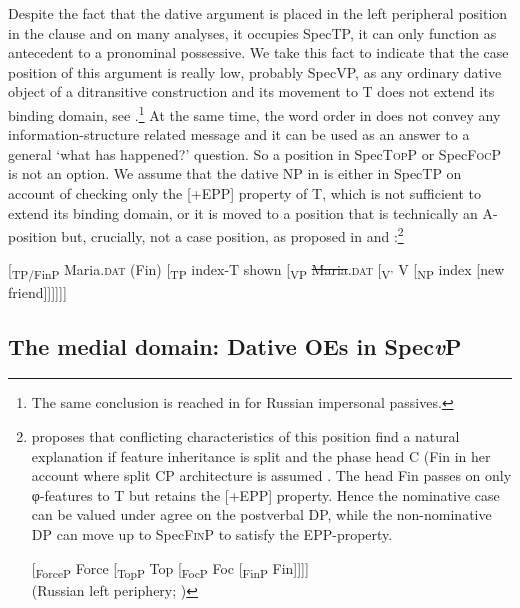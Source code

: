 \documentclass[output=paper,modfonts,nonflat
]{langsci/langscibook}
\begin{document}
\noindent Despite the fact that the dative argument is placed in the left peripheral position in the clause and on many analyses, it occupies SpecTP, it can only function as antecedent to a pronominal possessive. We take this fact to indicate that the case position of this argument is really low, probably SpecVP, as any ordinary dative object of a ditransitive construction and its movement to T does not extend its binding domain, see .\footnote{\label{fn21}The same conclusion is reached in \cite{mooreperlmutter2000} for Russian impersonal passives.} At the same time, the word order in  does not convey any information-structure related message and it can be used as an answer to a general ‘what has happened?’ question. So a position in Spec\textsc{Top}P or Spec\textsc{Foc}P is not an option. We assume that the dative NP in  is either in SpecTP on account of checking only the [+EPP] property of T, which is not sufficient to extend its binding domain, or it is moved to a position that is technically an A-position but, crucially, not a case position, as proposed in \cite{germain2015} and \cite{citkoetal2018}:\footnote{\label{fn22}\cite{germain2015} proposes that conflicting characteristics of this position find a natural explanation if feature inheritance is split and the phase head C (Fin in her account where  split CP architecture is assumed . The head Fin passes on only φ-features to T but retains the [+EPP] property. Hence the nominative case can be valued under agree on the postverbal DP, while the non-nominative DP can move up to Spec\textsc{Fin}P to satisfy the EPP-property.

\ea\label{split_cp_rus}
{[\textsubscript{ForceP} Force [\textsubscript{TopP} Top [\textsubscript{FocP} Foc [\textsubscript{FinP} Fin]]]]}\\
\xspace\hfill (Russian left periphery; \citealt[428]{germain2015})
\z
}

\ea \label{ex:witkos:33}
{[\textsubscript{TP/FinP} Maria.\textsc{dat} (Fin) [\textsubscript{TP} index-T shown [\textsubscript{VP} \sout{Maria}.\textsc{dat} [\textsubscript{V’} V [\textsubscript{NP} index [new friend]]]]]]}\\
\z

\subsection{The medial domain: Dative OEs in Spec\textit{v}P}\label{s3.2}
\end{document}
